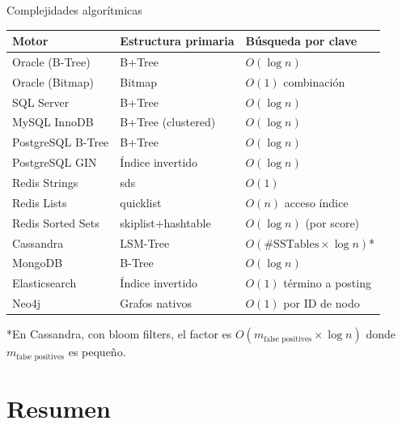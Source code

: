 \documentclass[aspectratio=169, 10pt, xcolor=table]{beamer}
\begin{document}
\begin{frame}{Complejidades algorítmicas}
    {\tiny
    \begin{table}
        \centering
        \begin{tabular}{l|l|l}
            \toprule
            \textbf{Motor} & \textbf{Estructura primaria} & \textbf{Búsqueda por clave} \\
            \midrule
            Oracle (B-Tree) & B+Tree & $O(\log n)$ \\
            Oracle (Bitmap) & Bitmap & $O(1)$ combinación \\
            SQL Server & B+Tree & $O(\log n)$ \\
            MySQL InnoDB & B+Tree (clustered) & $O(\log n)$ \\
            PostgreSQL B-Tree & B+Tree & $O(\log n)$ \\
            PostgreSQL GIN & Índice invertido & $O(\log n)$ \\
            Redis Strings & sds & $O(1)$ \\
            Redis Lists & quicklist & $O(n)$ acceso índice \\
            Redis Sorted Sets & skiplist+hashtable & $O(\log n)$ (por score) \\
            Cassandra & LSM-Tree & $O(\text{\#SSTables} \times \log n)$* \\
            MongoDB & B-Tree & $O(\log n)$ \\
            Elasticsearch & Índice invertido & $O(1)$ término a posting \\
            Neo4j & Grafos nativos & $O(1)$ por ID de nodo \\
            \bottomrule
        \end{tabular}
    \end{table}
    \vspace{0.2cm}
    *En Cassandra, con bloom filters, el factor es $O(m_{\text{false positives}} \times \log n)$ donde $m_{\text{false positives}}$ es pequeño.
    }
\end{frame}

\section{Resumen}
\end{document}
